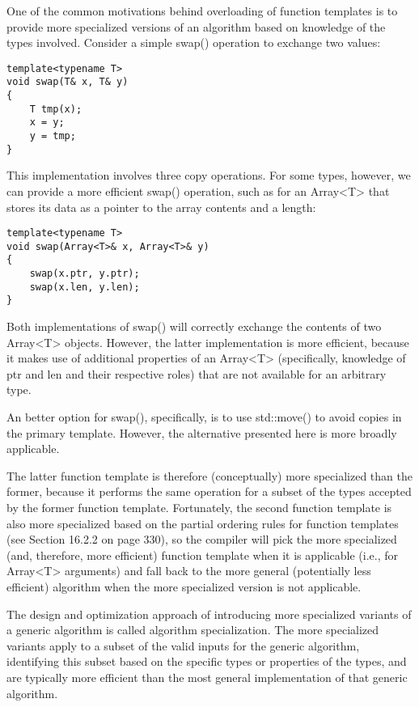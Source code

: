 
One of the common motivations behind overloading of function templates is to provide more specialized versions of an algorithm based on knowledge of the types involved. Consider a simple swap() operation to exchange two values:

\begin{lstlisting}[style=styleCXX]
template<typename T>
void swap(T& x, T& y)
{
	T tmp(x);
	x = y;
	y = tmp;
}
\end{lstlisting}

This implementation involves three copy operations. For some types, however, we can provide a more efficient swap() operation, such as for an Array<T> that stores its data as a pointer to the array contents and a length:

\begin{lstlisting}[style=styleCXX]
template<typename T>
void swap(Array<T>& x, Array<T>& y)
{
	swap(x.ptr, y.ptr);
	swap(x.len, y.len);
}
\end{lstlisting}

Both implementations of swap() will correctly exchange the contents of two Array<T> objects. However, the latter implementation is more efficient, because it makes use of additional properties of an Array<T> (specifically, knowledge of ptr and len and their respective roles) that are not available for an arbitrary type.

\begin{tcolorbox}[colback=webgreen!5!white,colframe=webgreen!75!black]
\hspace*{0.75cm}An better option for swap(), specifically, is to use std::move() to avoid copies in the primary template. However, the alternative presented here is more broadly applicable.
\end{tcolorbox}

The latter function template is therefore (conceptually) more specialized than the former, because it performs the same operation for a subset of the types accepted by the former function template. Fortunately, the second function template is also more specialized based on the partial ordering rules for function templates (see Section 16.2.2 on page 330), so the compiler will pick the more specialized (and, therefore, more efficient) function template when it is applicable (i.e., for Array<T> arguments) and fall back to the more general (potentially less efficient) algorithm when the more specialized version is not applicable.

The design and optimization approach of introducing more specialized variants of a generic algorithm is called algorithm specialization. The more specialized variants apply to a subset of the valid inputs for the generic algorithm, identifying this subset based on the specific types or properties of the types, and are typically more efficient than the most general implementation of that generic algorithm.

